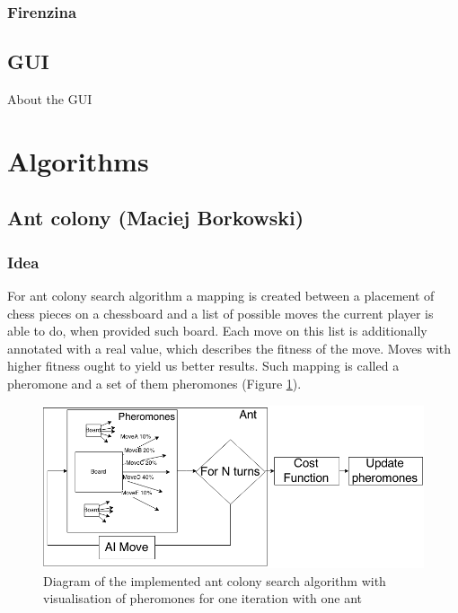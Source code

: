 \documentclass[pdftex]{article}
\begin{document}
\subsubsection{Firenzina}
\label{sec:firenzina}

\subsection{GUI}
\label{sec:uci}

About the GUI

\section{Algorithms}
\label{sec:project}

\subsection{Ant colony (Maciej Borkowski)}
\label{sec:ant}

\subsubsection{Idea}
For ant colony search algorithm a mapping is created between a placement of chess pieces on a chessboard and a list of possible moves the current player is able to do, when provided such board. Each move on this list is additionally annotated with a real value, which describes the fitness of the move. Moves with higher fitness ought to yield us better results. Such mapping is called a pheromone and a set of them pheromones (Figure \ref{fig:pheromones}).

\begin{figure}[!htb]
	\centering
	\includegraphics[width=1\textwidth]{ant/pheromones.png} 
	\caption{Diagram of the implemented ant colony search algorithm with visualisation of pheromones for one iteration with one ant}
	\label{fig:pheromones}
\end{figure}
\end{document}
